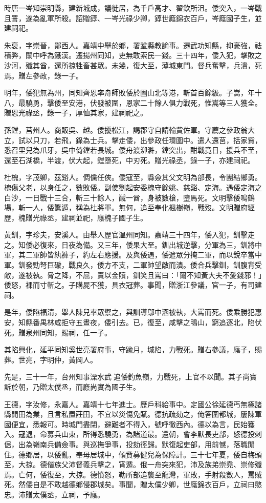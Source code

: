 \begin{pinyinscope}
時唐一岑知崇明縣，建新城成，議徙居，為千戶高才、翟欽所沮。倭突入，一岑戰且詈，遂為亂軍所殺。詔贈錞、一岑光祿少卿，錞世廕錦衣百戶，岑廕國子生，並建祠祀。

朱裒，字崇晉，鄖西人。嘉靖中舉於鄉，署鞏縣教諭事。遷武功知縣，抑豪強，祛積弊，關中呼為鐵漢。遷揚州同知，吏無敢索民一錢。三十四年，倭入犯，擊敗之沙河，殲其酋，還所掠牲畜甚眾。未幾，復大至，薄城東門。督兵奮擊，兵潰，死焉。贈左參政，錄一子。

明年，倭犯無為州，同知齊恩率舟師敗倭於圌山北等港，斬首百餘級。子嵩，年十八，最驍勇，擊倭至安港，伏發被圍，恩家二十餘人俱力戰死，惟嵩等三人獲全。贈恩光祿丞，錄一子，厚恤其家，建祠祀之。

孫鏜，莒州人。商販吳、越。倭擾松江，謁郡守自請輸貲佐軍。守薦之參政翁大立，試以只刀，若飛，錄為士兵。擊走倭，出參政任環圍中。遣人還莒，括家貲，悉召里兒為爪牙，吳中倚鏜若長城。倭舟渡泖滸，鏜突出，酣戰竟日，援兵不至，還至石湖橋，半渡，伏大起，鏜墮死，中刃死。贈光祿丞，錄一子，亦建祠祀。

杜槐，字茂卿，茲谿人。倜儻任俠。倭寇至，縣僉其父文明為部長，令團結鄉勇。槐傷父老，以身任之，數敗倭。副使劉起安委槐守餘姚、慈谿、定海。遇倭定海之白沙，一日戰十三合，斬三十餘人，馘一酋，身被數槍，墮馬死。文明擊倭鳴鶴場，斬一人，倭驚遁，稱為杜將軍。無何，追至奉化楓樹嶺，戰歿。文明贈府經歷，槐贈光祿丞，建祠並祀，廕槐子國子生。

黃釧，字珍夫，安溪人。由舉人歷官溫州同知。嘉靖三十四年，倭入犯，釧擊走之。知倭必復來，日夜為備。又三年，倭果大至。釧出城逆擊，分軍為三，釧將中軍，其二軍帥皆紈褲子，約左右應援。及與倭遇，倭遣眾分掩二軍，而以銳卒當中軍。釧發勁弩巨礮，戰良久，倭方不支，二軍帥望敵而潰。倭合兵擊釧，釧腹背受敵，遂被執。脅之降，不屈，責以金贖，釧笑且罵曰：「爾不知黃大夫不愛錢邪！」倭怒，裸而寸斬之。子購屍不獲，具衣冠葬。事聞，贈浙江參議，官一子，有司建祠。

是年，倭陷福清，舉人陳兒率眾禦之，與訓導鄔中涵被執，大罵而死。倭乘勝犯惠安，知縣番禺林咸拒守五晝夜，倭引去。已，復至，咸擊之鴨山，窮追逐北，陷伏死。贈泉州同知，賜祠，任一子。

其陷興化，延平同知奚世亮署府事，守踰月，城陷，力戰死。贈右參議，廕子，賜葬。世亮，字明仲，黃岡人。

先是，三十一年，台州知事溧水武追倭釣魚嶺，力戰死，上官不以聞。其子尚寶訴於朝，乃贈太僕丞，而廕尚實為國子生。

王德，字汝修，永嘉人。嘉靖十七年進士。歷戶科給事中。定國公徐延德丐無極諸縣閒田為業，且言私置莊田，不宜以災傷免賦。德抗疏劾之，俺答圍都城，屢陳軍國便宜，悉報可。時城門盡閉，避難者不得入，號呼徹西內。德以為言，民始獲入。寇退，命募兵山東，所得悉驍勇，為諸道最。還朝，會李默長吏部，怒德投刺倨，出為嶺南兵備僉事。與巡撫爭事，投劾徑歸。默復起吏部，用前憾，落職閒住。德鄉居，以倭亂，奉母居城中，傾貲募健兒為保障計。三十七年夏，倭自梅頭至，大掠。德偕族父沛督義兵擊之，宵遁。俄一舟突來犯，沛及族弟崇堯、崇修殲焉。亡何，倭復至，大掠。德憤怒，勒所部追襲至龍灣，軍敗，手射殺數人，罵賊死。然倭自是不敢越德鄉侵郡城矣。事聞，贈太僕少卿，世廕錦衣百戶，立祠曰愍忠。沛贈太僕丞，立祠，予廕。


\end{pinyinscope}
